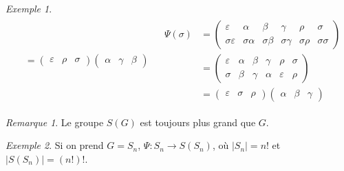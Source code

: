 \documentclass{report}
\newcommand*{\card}[1]{\left| #1 \right|}
\theoremstyle{definition}
\theoremstyle{remark}
\newtheorem*{exem}{Exemple}
\newtheorem*{rema}{Remarque}
\begin{document}
\begin{exem}
\begin{align*}
\begin{split}
				&= \begin{pmatrix}
					\varepsilon&\rho&\sigma
				\end{pmatrix} \begin{pmatrix}
					\alpha&\gamma&\beta
				\end{pmatrix}
			\end{split}
			&
			\begin{split}
				\Psi(\sigma)&= \begin{pmatrix}
					\varepsilon&\alpha&\beta&\gamma&\rho&\sigma\\
					\sigma\varepsilon&\sigma\alpha&\sigma\beta&\sigma\gamma&\sigma\rho&\sigma\sigma
				\end{pmatrix}\\
				&= \begin{pmatrix}
					\varepsilon&\alpha&\beta&\gamma&\rho&\sigma\\
					\sigma&\beta&\gamma&\alpha&\varepsilon&\rho
				\end{pmatrix}\\
				&= \begin{pmatrix}
					\varepsilon&\sigma&\rho
				\end{pmatrix} \begin{pmatrix}
					\alpha&\beta&\gamma
				\end{pmatrix}
			\end{split}
		\end{align*}
	\end{exem}
	\begin{rema}
		Le groupe $S(G)$ est toujours plus grand que $G$.
		\begin{exem}
			Si on prend $G=S_n$, $\Psi:S_n \to S(S_n)$, o\`u $\card{S_n} = n!$ et $\card{S(S_n)} = (n!)!$.
		\end{exem}
	\end{rema}
\end{document}
